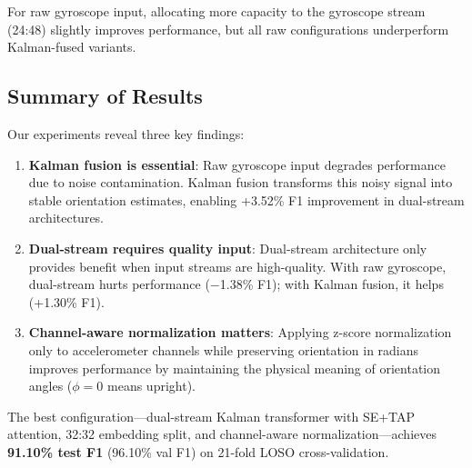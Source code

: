For raw gyroscope input, allocating more capacity to the gyroscope stream (24:48) slightly improves performance, but all raw configurations underperform Kalman-fused variants.

\subsection{Summary of Results}
\label{subsec:summary}

Our experiments reveal three key findings:

\begin{enumerate}
    \item \textbf{Kalman fusion is essential}: Raw gyroscope input degrades performance due to noise contamination. Kalman fusion transforms this noisy signal into stable orientation estimates, enabling +3.52\% F1 improvement in dual-stream architectures.

    \item \textbf{Dual-stream requires quality input}: Dual-stream architecture only provides benefit when input streams are high-quality. With raw gyroscope, dual-stream hurts performance ($-$1.38\% F1); with Kalman fusion, it helps (+1.30\% F1).

    \item \textbf{Channel-aware normalization matters}: Applying z-score normalization only to accelerometer channels while preserving orientation in radians improves performance by maintaining the physical meaning of orientation angles ($\phi = 0$ means upright).
\end{enumerate}

The best configuration---dual-stream Kalman transformer with SE+TAP attention, 32:32 embedding split, and channel-aware normalization---achieves \textbf{91.10\% test F1} (96.10\% val F1) on 21-fold LOSO cross-validation.

